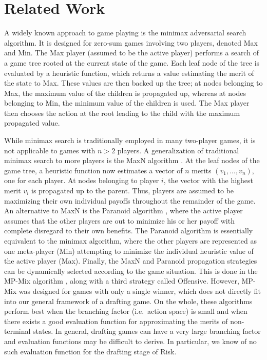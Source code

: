 \documentclass[letterpaper]{article}
\numberwithin{equation}{section}
\numberwithin{theorem}{section}
\numberwithin{lemma}{section}
\numberwithin{df}{section}
\begin{document}
\section{Related Work}

A widely known approach to game playing is the minimax adversarial search algorithm.  It is designed for zero-sum games involving two players, denoted Max and Min.  The Max player (assumed to be the active player) performs a search of a game tree rooted at the current state of the game.  Each leaf node of the tree is evaluated by a heuristic function, which returns a value estimating the merit of the state to Max.  These values are then backed up the tree; at nodes belonging to Max, the maximum value of the children is propagated up, whereas at nodes belonging to Min, the minimum value of the children is used.  The Max player then chooses the action at the root leading to the child with the maximum propagated value.


While minimax search is traditionally employed in many two-player games, it is not applicable to games with $n > 2$ players.  A generalization of traditional minimax search to more players is the MaxN algorithm \cite{MaxN}.  At the leaf nodes of the game tree, a heuristic function now estimates a vector of $n$ merits $(v_1, ..., v_n)$, one for each player.  At nodes belonging to player $i$, the vector with the highest merit $v_i$ is propagated up to the parent.  Thus, players are assumed to be maximizing their own individual payoffs throughout the remainder of the game.  An alternative to MaxN is the Paranoid algorithm \cite{Paranoid}, where the active player assumes that the other players are out to minimize his or her payoff with complete disregard to their own benefits.  The Paranoid algorithm is essentially equivalent to the minimax algorithm, where the other players are represented as one meta-player (Min) attempting to minimize the individual heuristic value of the active player (Max).  Finally, the MaxN and Paranoid propagation strategies can be dynamically selected according to the game situation.  This is done in the MP-Mix algorithm \cite{ZuckFelnerKraus2009}, along with a third strategy called Offensive.  However, MP-Mix was designed for games with only a single winner, which does not directly fit into our general framework of a drafting game.  On the whole, these algorithms perform best when the branching factor (i.e.~action space) is small and when there exists a good evaluation function for approximating the merits of non-terminal states.  In general, drafting games can have a very large branching factor and evaluation functions may be difficult to derive.  In particular, we know of no such evaluation function for the drafting stage of Risk.
\end{document}
